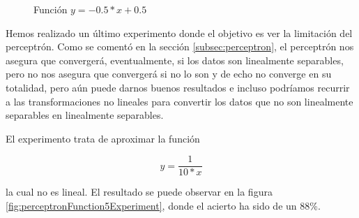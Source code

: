 \begin{figure}[H]
    \centering
    
    
    \caption{Función $y=-0.5*x+0.5$}
    \label{fig:perceptronFunction4Experiment}
\end{figure}

Hemos realizado un último experimento donde el objetivo es ver la limitación del perceptrón. Como se comentó en la sección \ref{subsec:perceptron}, el perceptrón nos asegura que convergerá, eventualmente, si los datos son linealmente separables, pero no nos asegura que convergerá si no lo son y de echo no converge en su totalidad, pero aún puede darnos buenos resultados e incluso podríamos recurrir a las transformaciones no lineales para convertir los datos que no son linealmente separables en linealmente separables.

El experimento trata de aproximar la función

\[y=\dfrac{1}{10*x}\]

la cual no es lineal. El resultado se puede observar en la figura \ref{fig:perceptronFunction5Experiment}, donde el acierto ha sido de un 88\%.

